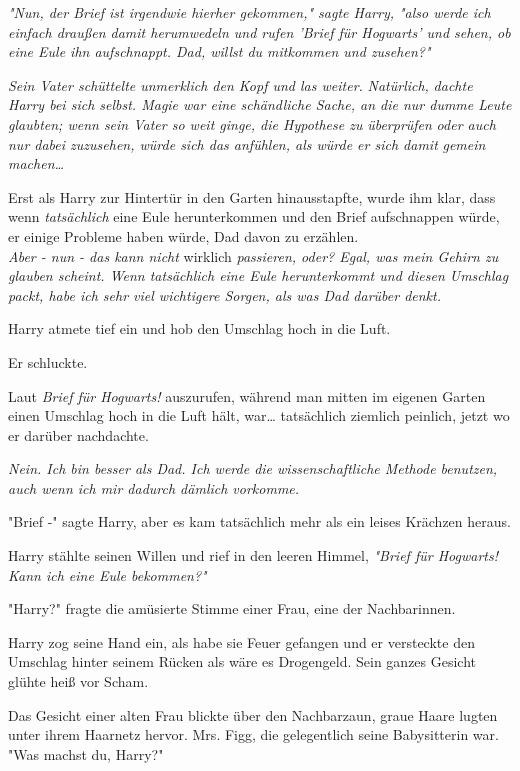 {\emph{"Nun, der Brief ist irgendwie hierher gekommen," sagte Harry, "also werde ich einfach draußen damit herumwedeln und rufen 'Brief für Hogwarts' und sehen, ob eine Eule ihn aufschnappt. Dad, willst du mitkommen und zusehen?"}

\emph{Sein Vater schüttelte unmerklich den Kopf und las weiter.} \emph{\emph{Natürlich,}} \emph{dachte Harry bei sich selbst. Magie war eine schändliche Sache, an die nur dumme Leute glaubten; wenn sein Vater so weit ginge, die Hypothese zu} \emph{\emph{überprüfen}} \emph{oder auch nur dabei zuzusehen, würde sich das anfühlen, als würde er sich damit} \emph{\emph{gemein machen}…}

Erst als Harry zur Hintertür in den Garten hinausstapfte, wurde ihm klar, dass wenn \emph{tatsächlich} eine Eule herunterkommen und den Brief aufschnappen würde, er einige Probleme haben würde, Dad davon zu erzählen.\\ \emph{Aber - nun - das kann nicht} wirklich \emph{passieren, oder? Egal, was mein Gehirn zu glauben scheint. Wenn tatsächlich eine Eule herunterkommt und diesen Umschlag packt, habe ich sehr viel wichtigere Sorgen, als was Dad darüber denkt.}

Harry atmete tief ein und hob den Umschlag hoch in die Luft.

Er schluckte.

Laut \emph{Brief für Hogwarts!} auszurufen, während man mitten im eigenen Garten einen Umschlag hoch in die Luft hält, war… tatsächlich ziemlich peinlich, jetzt wo er darüber nachdachte.

\emph{Nein. Ich bin besser als Dad. Ich werde die wissenschaftliche Methode benutzen, auch wenn ich mir dadurch dämlich vorkomme.}

"Brief -" sagte Harry, aber es kam tatsächlich mehr als ein leises Krächzen heraus.

Harry stählte seinen Willen und rief in den leeren Himmel, \emph{"Brief für Hogwarts! Kann ich eine Eule bekommen?"}

"Harry?" fragte die amüsierte Stimme einer Frau, eine der Nachbarinnen.

Harry zog seine Hand ein, als habe sie Feuer gefangen und er versteckte den Umschlag hinter seinem Rücken als wäre es Drogengeld. Sein ganzes Gesicht glühte heiß vor Scham.

Das Gesicht einer alten Frau blickte über den Nachbarzaun, graue Haare lugten unter ihrem Haarnetz hervor. Mrs. Figg, die gelegentlich seine Babysitterin war. "Was machst du, Harry?"

}
